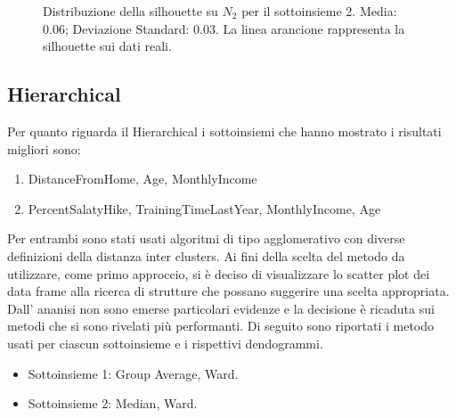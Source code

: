 \documentclass[a4paper,9pt]{article}
\begin{document}
\begin{figure}[H]
\begin{minipage}[b]{0.45\textwidth}
\caption{Distribuzione della silhouette su $N_2$ per il sottoinsieme 2. Media: 0.06; Deviazione Standard: 0.03. La linea arancione rappresenta la silhouette sui dati reali.}
\label{etichetta2}
\end{minipage}
\end{figure}

\subsection{Hierarchical}
Per quanto riguarda il Hierarchical i sottoinsiemi che hanno mostrato i risultati migliori sono:

\begin{enumerate}
\item DistanceFromHome, Age, MonthlyIncome
\item PercentSalatyHike, TrainingTimeLastYear, MonthlyIncome, Age
\end{enumerate}

Per entrambi sono stati usati algoritmi di tipo agglomerativo con diverse definizioni della distanza inter clusters.
Ai fini della scelta del metodo da utilizzare, come primo approccio, si è deciso di visualizzare
lo scatter plot dei data frame alla ricerca di strutture che possano suggerire una scelta appropriata.
Dall' ananisi non sono emerse particolari evidenze e la decisione è ricaduta sui metodi che si sono rivelati più performanti.
Di seguito sono riportati i metodo usati per ciascun sottoinsieme e i rispettivi dendogrammi.

\begin{itemize}
\item Sottoinsieme 1: Group Average, Ward.
\item Sottoinsieme 2: Median, Ward.
\end{itemize}
\end{document}
